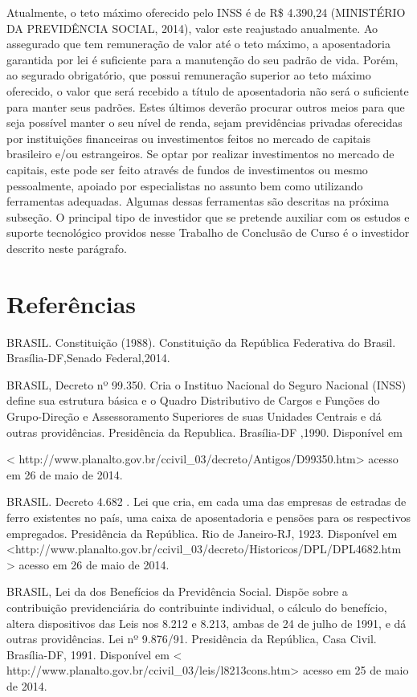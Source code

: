 \begin{apendicesenv}
Atualmente, o teto máximo oferecido pelo INSS é de R\$ 4.390,24 (MINISTÉRIO DA PREVIDÊNCIA SOCIAL, 2014), valor este reajustado anualmente. Ao assegurado que tem remuneração de valor até o teto máximo, a aposentadoria garantida por lei é suficiente para a manutenção do seu padrão de vida. Porém, ao segurado obrigatório, que possui remuneração superior ao teto máximo oferecido, o valor que será recebido a título de aposentadoria não será o suficiente para manter seus padrões. Estes últimos deverão procurar outros meios para que seja possível manter o seu nível de renda, sejam previdências privadas oferecidas por instituições financeiras ou investimentos feitos no mercado de capitais brasileiro e/ou estrangeiros. Se optar por realizar investimentos no mercado de capitais, este pode ser feito através de fundos de investimentos ou mesmo pessoalmente, apoiado por especialistas no assunto bem como utilizando ferramentas adequadas. Algumas dessas ferramentas são descritas na próxima subseção. O principal tipo de investidor que se pretende auxiliar com os estudos e suporte tecnológico providos nesse Trabalho de Conclusão de Curso é o investidor descrito neste parágrafo.

\section*{Referências}

BRASIL. Constituição (1988). Constituição da República Federativa do Brasil. Brasília-DF,Senado Federal,2014.

BRASIL, Decreto nº 99.350. Cria o Instituo Nacional do Seguro Nacional (INSS) define sua estrutura básica e o Quadro Distributivo de Cargos e Funções do Grupo-Direção e Assessoramento Superiores de suas Unidades Centrais e dá outras providências. Presidência da Republica. Brasília-DF ,1990. Disponível em

< http://www.planalto.gov.br/ccivil\_03/decreto/Antigos/D99350.htm>
 acesso em 26 de maio de 2014.

BRASIL. Decreto 4.682 . Lei que cria, em cada uma das empresas de estradas de ferro existentes no país, uma caixa de aposentadoria e pensões para os respectivos empregados. Presidência da República. Rio de Janeiro-RJ, 1923. Disponível em 
<http://www.planalto.gov.br/ccivil\_03/decreto/Historicos/DPL/DPL4682.htm > 
acesso em 26 de maio de 2014.

BRASIL, Lei da dos Benefícios da Previdência Social. Dispõe sobre a contribuição previdenciária do contribuinte individual, o cálculo do benefício, altera dispositivos das Leis nos 8.212 e 8.213, ambas de 24 de julho de 1991, e dá outras providências. Lei nº 9.876/91. Presidência da República, Casa Civil. Brasília-DF, 1991. Disponível em < http://www.planalto.gov.br/ccivil\_03/leis/l8213cons.htm> 
acesso em 25 de maio de 2014.


\end{apendicesenv}
